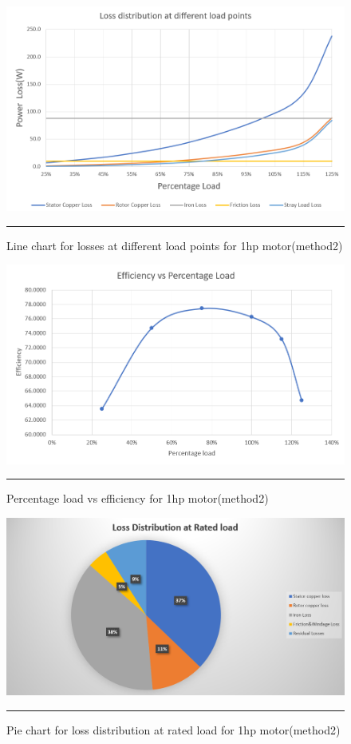 \begin{figure}[hbtp!]
	\centering
		\includegraphics[width = 4.5in]{./Figures/MS/fig59.png}
		\rule{35em}{0.5pt}
	\caption{Line chart for losses at different load points for 1hp motor(method2)}
	\label{fig:Line chart for losses at different load points for 1hp motor(method2)} 
\end{figure}

\begin{figure}[hbtp!]
	\centering
		\includegraphics[width = 4.5in]{./Figures/MS/fig510.png}
		\rule{35em}{0.5pt}
	\caption{Percentage load vs efficiency for 1hp motor(method2)}
	\label{fig:Percentage load vs efficiency for 1hp motor(method2)} 
\end{figure}

\begin{figure}[hbtp!]
	\centering
		\includegraphics[width = 4.5in]{./Figures/MS/fig511.png}
		\rule{35em}{0.5pt}
	\caption{Pie chart for loss distribution at rated load for 1hp motor(method2)}
	\label{fig:Pie chart for loss distribution at rated load for 1hp motor(method2)} 
\end{figure}

